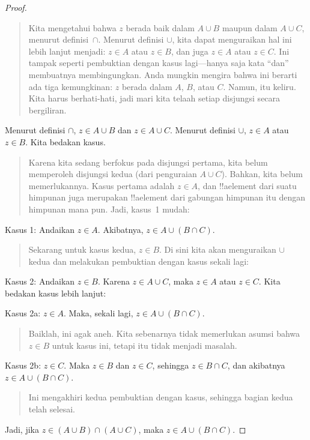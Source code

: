 \documentclass[../../../include/open-logic-section]{subfiles}
\begin{document}
\begin{proof}
\begin{quote}
Kita mengetahui bahwa $z$ berada baik dalam $A \cup B$ maupun dalam $A
\cup C$, menurut definisi~$\cap$. Menurut definisi $\cup$, kita dapat
menguraikan hal ini lebih lanjut menjadi: $z \in A$ atau $z \in B$,
dan juga $z \in A$ atau $z \in C$. Ini tampak seperti pembuktian
dengan kasus lagi---hanya saja kata ``dan'' membuatnya membingungkan.
Anda mungkin mengira bahwa ini berarti ada tiga kemungkinan: $z$
berada dalam $A$, $B$, atau $C$. Namun, itu keliru. Kita harus
berhati-hati, jadi mari kita telaah setiap disjungsi secara bergiliran.
\end{quote}
Menurut definisi $\cap$, $z \in A \cup B$ dan $z \in A \cup C$.
Menurut definisi $\cup$, $z \in A$ atau $z \in B$. Kita bedakan kasus.
\begin{quote}
Karena kita sedang berfokus pada disjungsi pertama, kita belum
memperoleh disjungsi kedua (dari penguraian $A \cup C$). Bahkan, kita
belum memerlukannya. Kasus pertama adalah $z \in A$, dan !!a{element}
dari suatu himpunan juga merupakan !!a{element} dari gabungan himpunan
itu dengan himpunan mana pun. Jadi, kasus~1 mudah:
\end{quote}
Kasus 1: Andaikan $z \in A$. Akibatnya, $z \in A \cup (B \cap C)$.
\begin{quote}
Sekarang untuk kasus kedua, $z \in B$. Di sini kita akan menguraikan
$\cup$ kedua dan melakukan pembuktian dengan kasus sekali lagi:
\end{quote}
Kasus 2: Andaikan $z \in B$. Karena $z \in A \cup C$, maka $z \in A$
atau $z \in C$. Kita bedakan kasus lebih lanjut:

Kasus 2a: $z \in A$. Maka, sekali lagi, $z \in A \cup (B \cap C)$.
\begin{quote}
Baiklah, ini agak aneh. Kita sebenarnya tidak memerlukan asumsi bahwa
~$z \in B$ untuk kasus ini, tetapi itu tidak menjadi masalah.
\end{quote}
Kasus 2b: $z \in C$. Maka $z \in B$ dan $z \in C$, sehingga $z \in B
\cap C$, dan akibatnya $z \in A \cup (B \cap C)$.
\begin{quote}
Ini mengakhiri kedua pembuktian dengan kasus, sehingga bagian kedua
telah selesai.
\end{quote}
Jadi, jika $z \in (A \cup B) \cap (A \cup C)$, maka $z \in A \cup (B
\cap C)$.
\end{proof}
\end{document}
